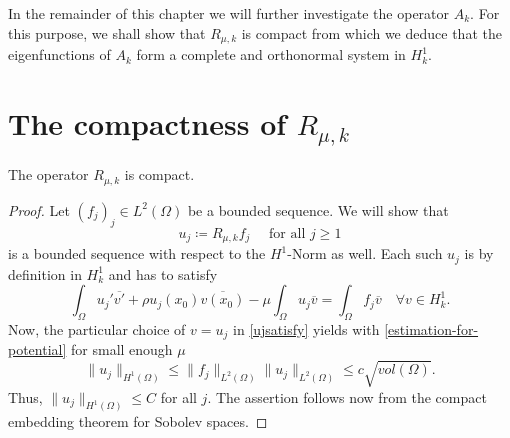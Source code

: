 In the remainder of this chapter we will further investigate the operator $A_{k}$. For this purpose, we shall show that $R_{\mu, k}$ is compact from which we deduce that the eigenfunctions of $A_{k}$ form a complete and orthonormal system in $H^{1}_{k}$.

\section{The compactness of  $R_{\mu, k}$} 

\begin{theorem} \label{3.1:thm-Rmuk.isCompact}
	The operator $R_{\mu, k}$ is compact.

	\begin{proof}
	Let $(f_{j})_{j} \in L^{2}(\Omega)$ be a  bounded sequence. We will show that 
		\[ u_{j} \coloneqq R_{\mu, k} f_{j} \quad \text{ for all } j \geq 1 \]
	is a bounded sequence with respect to the $H^{1}$-Norm as well. Each such $u_{j}$ is by definition in $H^{1}_{k}$ and has to satisfy
		\begin{equation}
			\int_{\Omega} u_{j}' \overline{v'} + \rho u_{j}(x_{0}) \overline{v(x_{0})} - \mu \int_{\Omega} u_{j} \overline{v} = \int_{\Omega} f_{j} \overline{v} \quad \forall v \in H^{1}_{k}. \label{ujsatisfy}
		\end{equation} 
	Now, the particular choice of $v = u_{j}$ in \eqref{ujsatisfy} yields with \eqref{estimation-for-potential} for small enough $\mu$
		\[  \| u_{j} \|_{H^{1}(\Omega)} \leq \| f_{j} \|_{L^{2}(\Omega)} \| u_{j} \|_{L^{2}(\Omega)} \leq c \sqrt{vol(\Omega)}. \]
	Thus, $\| u_{j} \|_{H^{1}(\Omega)} \leq C$ for all $j$. The assertion follows now from the compact embedding theorem for Sobolev spaces.
	\end{proof}	
\end{theorem}		

